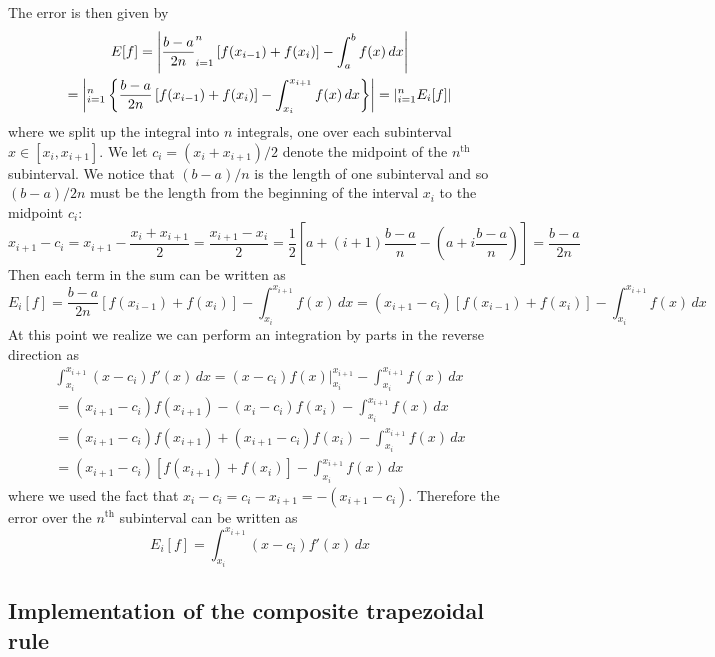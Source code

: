 \documentclass[11pt]{article}
\let\sumop\relax
\begin{document}
The error is then given by
\begin{multline*}
  E[f] = \left\lvert \frac{b-a}{2n} \sumop_{i=1}^n \left[ f(x_{i-1}) + f(x_i) \right] - \int_a^b f(x) \, dx \right\rvert \\
  = \left\lvert \sumop_{i=1}^n \left\{ \frac{b-a}{2n} \left[ f(x_{i-1}) + f(x_i) \right] - \int_{x_i}^{x_{i+1}} f(x) \, dx \right\} \right\rvert
  = \left\lvert \sumop_{i=1}^n E_i[f] \right\rvert
\end{multline*}
where we split up the integral into $n$ integrals, one over each subinterval $x \in [x_{i}, x_{i+1}]$. We let $c_i = (x_{i} + x_{i+1})/2$ denote the midpoint of the $n^\mathrm{th}$ subinterval. We notice that $(b-a)/n$ is the length of one subinterval and so $(b-a)/2n$ must be the length from the beginning of the interval $x_i$ to the midpoint $c_i$:
\begin{equation*}
  x_{i+1} - c_i = x_{i+1} - \frac{x_{i} + x_{i+1}}{2} = \frac{x_{i+1} - x_i}{2}
  = \frac{1}{2} \left[ a + (i+1)\frac{b-a}{n} - \left( a + i\frac{b-a}{n} \right) \right]
  = \frac{b-a}{2n}
\end{equation*}
Then each term in the sum can be written as
\begin{equation*}
  E_i[f]
  = \frac{b-a}{2n} \left[ f(x_{i-1}) + f(x_i) \right] - \int_{x_i}^{x_{i+1}} f(x) \, dx
  = (x_{i+1} - c_i) \left[ f(x_{i-1}) + f(x_i) \right] - \int_{x_i}^{x_{i+1}} f(x) \, dx
\end{equation*}
At this point we realize we can perform an integration by parts in the reverse direction as 
\begin{multline*}
  \int_{x_i}^{x_{i+1}} (x-c_i) f'(x) \, dx
  = (x-c_i)f(x) \Big\rvert_{x_i}^{x_{i+1}} - \int_{x_i}^{x_{i+1}} f(x) \, dx \\
  = (x_{i+1}-c_i)f(x_{i+1}) - (x_i-c_i)f(x_i) - \int_{x_i}^{x_{i+1}} f(x) \, dx \\
  = (x_{i+1}-c_i)f(x_{i+1}) + (x_{i+1}-c_i)f(x_i) - \int_{x_i}^{x_{i+1}} f(x) \, dx \\
  = (x_{i+1}-c_i)\left[ f(x_{i+1}) + f(x_i) \right] - \int_{x_i}^{x_{i+1}} f(x) \, dx
\end{multline*}
where we used the fact that $x_i - c_i = c_i - x_{i+1} = - (x_{i+1} - c_i)$. Therefore the error over the $n^\mathrm{th}$ subinterval can be written as
\begin{equation*}
  E_i[f] = \int_{x_i}^{x_{i+1}} (x-c_i) f'(x) \, dx
\end{equation*}

\subsection{Implementation of the composite trapezoidal rule}
\end{document}
